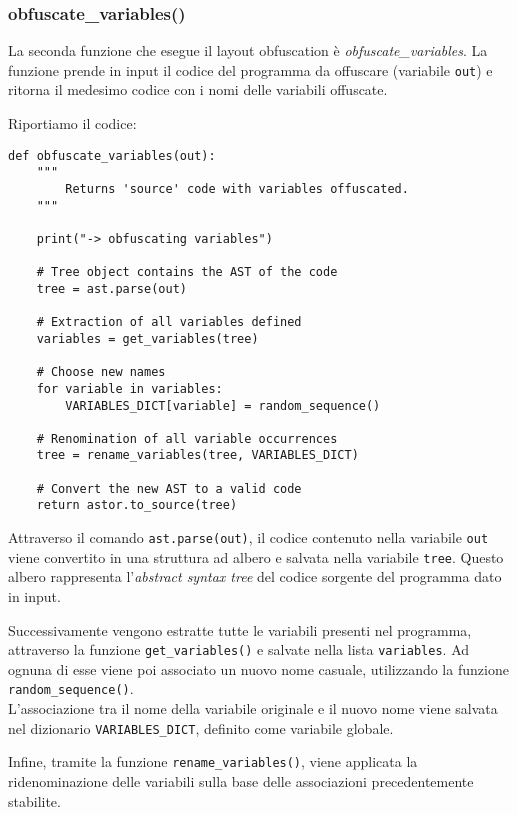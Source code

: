 \documentclass[a4paper,oneside,openright,titlepage,10pt,footinclude,headinclude]{scrbook}
\begin{document}
\subsubsection{obfuscate\_variables()}

La seconda funzione che esegue il layout obfuscation è \emph{obfuscate\_variables}.
La funzione prende in input il codice del programma da offuscare (variabile \texttt{out}) e ritorna il medesimo codice con i nomi delle variabili offuscate.\medskip


\noindent Riportiamo il codice:
\begin{graybox}[innerleftmargin=2,]
\begin{lstlisting}
def obfuscate_variables(out):
    """
        Returns 'source' code with variables offuscated.
    """

    print("-> obfuscating variables")

    # Tree object contains the AST of the code
    tree = ast.parse(out)

    # Extraction of all variables defined
    variables = get_variables(tree)

    # Choose new names
    for variable in variables:
        VARIABLES_DICT[variable] = random_sequence()

    # Renomination of all variable occurrences
    tree = rename_variables(tree, VARIABLES_DICT)

    # Convert the new AST to a valid code
    return astor.to_source(tree)
\end{lstlisting}
\end{graybox}

Attraverso il comando \texttt{ast.parse(out)}, il codice contenuto nella variabile \texttt{out} viene convertito in una struttura ad albero e salvata nella variabile \texttt{tree}. Questo albero rappresenta l'\emph{abstract syntax tree} del codice sorgente del programma dato in input.

Successivamente vengono estratte tutte le variabili presenti nel programma, attraverso la funzione \texttt{get\_variables()} e salvate nella lista \texttt{variables}. Ad ognuna di esse viene poi associato un nuovo nome casuale, utilizzando la funzione \texttt{random\_sequence()}.\\
L'associazione tra il nome della variabile originale e il nuovo nome viene salvata nel dizionario \texttt{VARIABLES\_DICT}, definito come variabile globale.

Infine, tramite la funzione \texttt{rename\_variables()}, viene applicata la ridenominazione delle variabili sulla base delle associazioni precedentemente stabilite.
\end{document}
